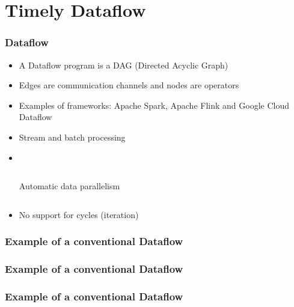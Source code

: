 \documentclass[aspectratio=169,10pt]{beamer}
\begin{document}
\section{Timely Dataflow}

\begin{frame}
  \frametitle{Dataflow}
  \begin{itemize}
    \item A Dataflow program is a DAG (Directed Acyclic Graph)
          \pause
    \item Edges are communication channels and nodes are operators
          \pause
    \item Examples of frameworks: Apache Spark, Apache Flink and Google Cloud Dataflow
          \pause
    \item Stream and batch processing
          \pause
    \item \  \begin{columns}
      \begin{column}{.4\textwidth}
        Automatic data parallelism
      \end{column}
      \begin{column}{.45\textwidth}
        \resizebox{0.85\textwidth}{!}
        {
          
        }
      \end{column}
      \end{columns}
          \pause
    \item No support for cycles (iteration)
  \end{itemize}
\end{frame}

\begin{frame}
  \frametitle{Example of a conventional Dataflow}
  \begin{center}
    
  \end{center}
\end{frame}

\begin{frame}
  \frametitle{Example of a conventional Dataflow}
  \begin{center}
    
  \end{center}
\end{frame}

\begin{frame}
  \frametitle{Example of a conventional Dataflow}
  \begin{center}
    
  \end{center}
\end{frame}
\end{document}
